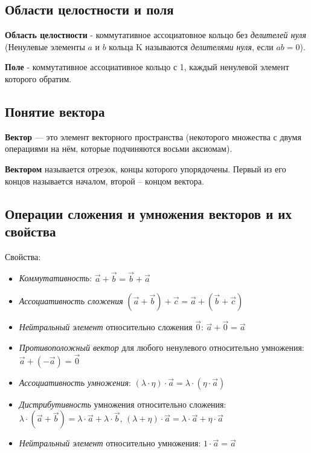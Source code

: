 \documentclass[a4paper]{article}
\begin{document}
\subsection*{Области целостности и поля}
\textbf{Область целостности} - коммутативное ассоциатовное кольцо без \textit{делителей нуля} (Ненулевые элементы $a$ и $b$ кольца K называются \textit{делителями нуля}, если $ab = 0$).

\textbf{Поле} - коммутативное ассоциативное кольцо с 1, каждый ненулевой элемент которого обратим.



\newpage \begin{center}\begin{Large}\end{Large}\end{center}
\subsection*{Понятие вектора}
\textbf{Вектор} — это элемент векторного пространства (некоторого множества с двумя операциями на нём, которые подчиняются восьми аксиомам).

\textbf{Вектором} называется отрезок,
концы которого упорядочены. Первый из его концов
называется началом, второй – концом вектора.

\subsection*{Операции сложения и умножения векторов и их свойства}

Свойства:
\begin{itemize}
\item \textit{Коммутативность}: $\vec{a} + \vec{b} = \vec{b} + \vec{a}$
\item \textit{Ассоциативность сложения} $(\vec{a} + \vec{b}) + \vec{c} = \vec{a} + (\vec{b}+\vec{c})$
\item \textit{Нейтральный элемент} относительно сложения $\vec{0}$: $\vec{a} + \vec{0} = \vec{a}$
\item \textit{Противоположный вектор} для любого ненулевого относительно умножения: $\vec{a}+(-\vec{a}) = \vec{0}$
\item \textit{Ассоциативность умножения}: $(\lambda \cdot \eta) \cdot \vec{a} = \lambda \cdot ( \eta \cdot \vec{a})$
\item \textit{Дистрибутивность} умножения относительно сложения: $\lambda \cdot (\vec{a} + \vec{b}) = \lambda \cdot \vec{a} + \lambda \cdot \vec{b}$, $(\lambda + \eta) \cdot \vec{a} = \lambda \cdot \vec{a} + \eta \cdot \vec{a}$
\item \textit{Нейтральный элемент} относительно умножения: $1 \cdot \vec{a} = \vec{a}$
\end{itemize}
\end{document}
